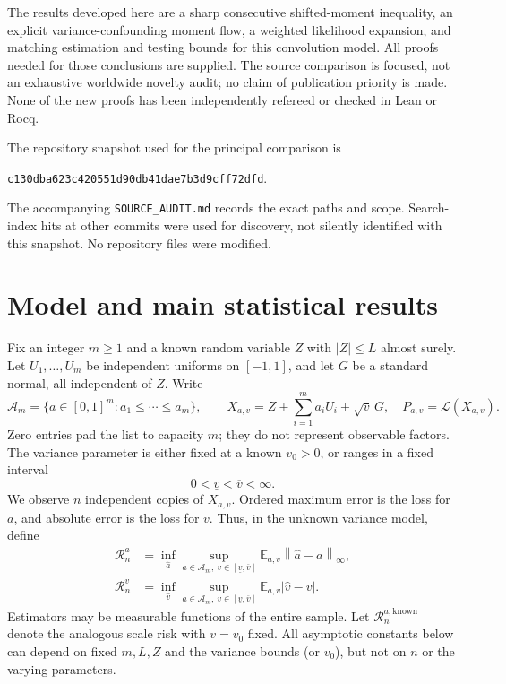 \documentclass[11pt,a4paper]{article}
\numberwithin{equation}{section}
\theoremstyle{definition}
\theoremstyle{remark}
\newcommand{\E}{\mathbb E}
\newcommand{\Law}{\mathcal L}
\newcommand{\norm}[1]{\left\lVert#1\right\rVert}
\newcommand{\As}{\mathcal A_m}
\newcommand{\risk}{\mathcal R}
\begin{document}
The results developed here are a sharp consecutive shifted-moment inequality,
an explicit variance-confounding moment flow, a weighted likelihood expansion,
and matching estimation and testing bounds for this convolution model. All
proofs needed for those conclusions are supplied. The source comparison is
focused, not an exhaustive worldwide novelty audit; no claim of publication
priority is made. None of the new proofs has been independently refereed or
checked in Lean or Rocq.

The repository snapshot used for the principal comparison is
\begin{center}
\small\texttt{c130dba623c420551d90db41dae7b3d9cff72dfd}.
\end{center}
The accompanying \texttt{SOURCE\_AUDIT.md} records the exact paths and scope.
Search-index hits at other commits were used for discovery, not silently
identified with this snapshot. No repository files were modified.

\section{Model and main statistical results}
\label{sec:model}

Fix an integer $m\ge1$ and a known random variable $Z$ with $|Z|\le L$ almost
surely. Let $U_1,\ldots,U_m$ be independent uniforms on $[-1,1]$, and let $G$ be
a standard normal, all independent of $Z$. Write
\begin{equation}
 \As=\{a\in[0,1]^m:a_1\le\cdots\le a_m\},\qquad
 X_{a,v}=Z+\sum_{i=1}^m a_iU_i+\sqrt v\,G,
 \quad P_{a,v}=\Law(X_{a,v}).
 \label{eq:model}
\end{equation}
Zero entries pad the list to capacity $m$; they do not represent observable
factors. The variance parameter is either fixed at a known $v_0>0$, or ranges
in a fixed interval
\begin{equation}
 0<\underline v<\overline v<\infty.
 \label{eq:varianceinterval}
\end{equation}
We observe $n$ independent copies of $X_{a,v}$. Ordered maximum error is the
loss for $a$, and absolute error is the loss for $v$. Thus, in the unknown
variance model, define
\begin{align}
 \risk^a_n&=\inf_{\widehat a}\sup_{a\in\As,\ v\in[\underline v,\overline v]}
       \E_{a,v}\norm{\widehat a-a}_\infty,\\
 \risk^v_n&=\inf_{\widehat v}\sup_{a\in\As,\ v\in[\underline v,\overline v]}
       \E_{a,v}|\widehat v-v|.
 \label{eq:risks}
\end{align}
Estimators may be measurable functions of the entire sample. Let
$\risk^{a,\mathrm{known}}_n$ denote the analogous scale risk with $v=v_0$ fixed.
All asymptotic constants below can depend on fixed $m,L,Z$ and the variance
bounds (or $v_0$), but not on $n$ or the varying parameters.
\end{document}
